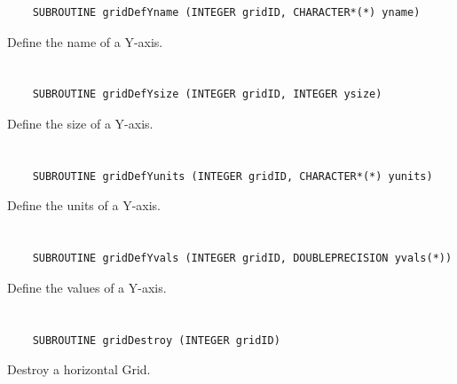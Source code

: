 \begin{verbatim}
    SUBROUTINE gridDefYname (INTEGER gridID, CHARACTER*(*) yname)
\end{verbatim}

Define the name of a Y-axis.


\section*{\tt {}}

\begin{verbatim}
    SUBROUTINE gridDefYsize (INTEGER gridID, INTEGER ysize)
\end{verbatim}

Define the size of a Y-axis.


\section*{\tt {}}

\begin{verbatim}
    SUBROUTINE gridDefYunits (INTEGER gridID, CHARACTER*(*) yunits)
\end{verbatim}

Define the units of a Y-axis.


\section*{\tt {}}

\begin{verbatim}
    SUBROUTINE gridDefYvals (INTEGER gridID, DOUBLEPRECISION yvals(*))
\end{verbatim}

Define the values of a Y-axis.


\section*{\tt {}}

\begin{verbatim}
    SUBROUTINE gridDestroy (INTEGER gridID)
\end{verbatim}

Destroy a horizontal Grid.


\section*{\tt {}}

